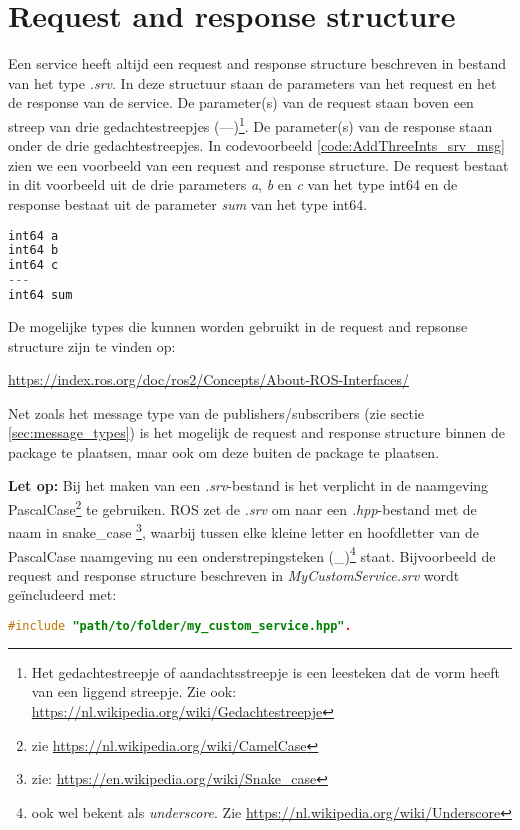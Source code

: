\section{Request and response structure}
\label{sec:srv_messages}
Een service heeft altijd een request and response structure beschreven in bestand van het type \textit{.srv}. In deze structuur staan de parameters van het request en het de response van de service. De parameter(s) van de request staan boven een streep van drie gedachtestreepjes (---)\footnote{Het gedachtestreepje of aandachtsstreepje is een leesteken dat de vorm heeft van een liggend streepje. Zie ook: \url{https://nl.wikipedia.org/wiki/Gedachtestreepje}}. De parameter(s) van de response staan onder de drie gedachtestreepjes. In codevoorbeeld \ref{code:AddThreeInts_srv_msg} zien we een voorbeeld van een request and response structure. De request bestaat in dit voorbeeld uit de drie parameters \textit{a}, \textit{b} en \textit{c} van het type int64 en de response bestaat uit de parameter \textit{sum} van het type int64. 

\begin{lstlisting}[language=C++, caption={AddThreeInts.srv}, firstnumber=0, label={code:AddThreeInts_srv_msg}]
int64 a
int64 b
int64 c
---
int64 sum
\end{lstlisting}

\noindent De mogelijke types die kunnen worden gebruikt in de request and repsonse structure zijn te vinden op:
\begin{center}
    \url{https://index.ros.org/doc/ros2/Concepts/About-ROS-Interfaces/}
\end{center}

\noindent Net zoals het message type van de publishers/subscribers (zie sectie \ref{sec:message_types}) is het mogelijk de request and response structure binnen de package te plaatsen, maar ook om deze buiten de package te plaatsen. 

\noindent \textbf{Let op:} Bij het maken van een \textit{.srv}-bestand is het verplicht in de naamgeving PascalCase\footnote{zie \url{https://nl.wikipedia.org/wiki/CamelCase}} te gebruiken. ROS zet de \textit{.srv} om naar een \textit{.hpp}-bestand met de naam in snake\_case \footnote{zie: \url{https://en.wikipedia.org/wiki/Snake_case}}, waarbij tussen elke kleine letter en hoofdletter van de PascalCase naamgeving nu een onderstrepingsteken (\_)\footnote{ook wel bekent als \textit{underscore}. Zie \url{https://nl.wikipedia.org/wiki/Underscore}} staat. Bijvoorbeeld de request and response structure beschreven in \textit{MyCustomService.srv} wordt geïncludeerd met: 
\begin{lstlisting}[language=C++, caption={}, firstnumber=0, label={}]
#include "path/to/folder/my_custom_service.hpp".
\end{lstlisting}

